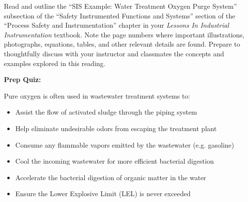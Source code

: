 

Read and outline the ``SIS Example: Water Treatment Oxygen Purge System'' subsection of the ``Safety Instrumented Functions and Systems'' section of the ``Process Safety and Instrumentation'' chapter in your {\it Lessons In Industrial Instrumentation} textbook.  Note the page numbers where important illustrations, photographs, equations, tables, and other relevant details are found.  Prepare to thoughtfully discuss with your instructor and classmates the concepts and examples explored in this reading.













\vfil \eject

\noindent
{\bf Prep Quiz:}

Pure oxygen is often used in wastewater treatment systems to:

\begin{itemize}
\item{} Assist the flow of activated sludge through the piping system
\vskip 5pt 
\item{} Help eliminate undesirable odors from escaping the treatment plant
\vskip 5pt 
\item{} Consume any flammable vapors emitted by the wastewater (e.g. gasoline)
\vskip 5pt 
\item{} Cool the incoming wastewater for more efficient bacterial digestion
\vskip 5pt 
\item{} Accelerate the bacterial digestion of organic matter in the water
\vskip 5pt 
\item{} Ensure the Lower Explosive Limit (LEL) is never exceeded
\end{itemize}




